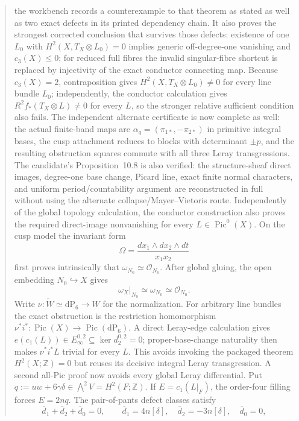 \documentclass[11pt,letterpaper]{article}
\theoremstyle{definition}
\theoremstyle{remark}
\begin{document}
\begin{abstract}
the workbench records a counterexample to that theorem as stated as well as
two exact defects in its printed dependency chain.  It also proves the
strongest corrected conclusion that survives those defects: existence of one
\(L_0\) with \(H^2(X,T_X\otimes L_0)=0\) implies generic
off-degree-one vanishing and \(c_3(X)\le0\); for reduced full fibres the
invalid singular-fibre shortcut is replaced by injectivity of the exact
conductor connecting map.  Because \(c_3(X)=2\), contraposition gives
\(H^2(X,T_X\otimes L_0)\ne0\) for every line bundle \(L_0\); independently,
the conductor calculation gives \(R^2f_*(T_X\otimes L)\ne0\) for every
\(L\), so the stronger relative sufficient condition also fails.  The
independent alternate
certificate is now complete as well: the actual finite-band maps are
$\alpha_q=(\pi_{1*},-\pi_{2*})$ in primitive integral bases, the cusp
attachment reduces to blocks with determinant $\pm p$, and the resulting
obstruction squares commute with all three Leray transgressions.  The
candidate's Proposition~10.8 is also verified: the
structure-sheaf direct images, degree-one base change, Picard line, exact
finite normal characters, and uniform period/countability argument are
reconstructed in full without using the alternate collapse/Mayer--Vietoris
route.
Independently of the global topology calculation, the conductor construction
also proves the required direct-image nonvanishing for every
$L\in\operatorname{Pic}^0(X)$.  On the cusp model the invariant form
\[
 \Omega=\frac{dx_1\wedge dx_2\wedge dt}{x_1x_2}
\]
first proves intrinsically that
\(\omega_{N_0}\simeq\mathcal O_{N_0}\).  After global gluing, the open
embedding \(N_0\hookrightarrow X\) gives
\[
 \omega_X|_{N_0}\simeq\omega_{N_0}\simeq\mathcal O_{N_0}.
\]
Write $\nu:\widetilde W\simeq\mathrm{dP}_6\to W$ for the normalization.
For arbitrary line bundles the exact
obstruction is the restriction homomorphism
$\nu^*i^*:\operatorname{Pic}(X)\to\operatorname{Pic}(\mathrm{dP}_6)$.  A direct
Leray-edge calculation gives
$e(c_1(L))\in E_\infty^{0,2}\subseteq\ker d_2^{0,2}=0$; proper-base-change
naturality then makes $\nu^*i^*L$ trivial for every $L$.  This avoids
invoking the packaged theorem $H^2(X;\mathbb Z)=0$ but reuses its decisive
integral Leray transgression.  A second all-Pic proof now avoids every global
Leray differential.  Put $q:=uw+6\gamma\delta\in\bigwedge^2V=H^2(F;\mathbb Z)$.
If $E=c_1(L|_F)$, the order-four filling forces
$E=2nq$.  The pair-of-pants defect classes satisfy
\[
 \bar d_1+\bar d_2+\bar d_0=0,\qquad
 \bar d_1=4n[\delta],\quad \bar d_2=-3n[\delta],\quad \bar d_0=0,
\]
\end{abstract}
\end{document}
